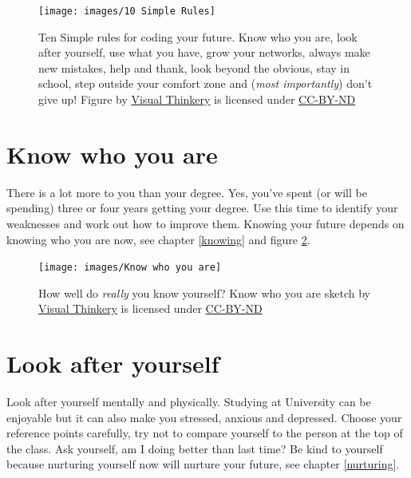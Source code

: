 \documentclass[
]{book}
\begin{document}
\begin{figure}

{\centering \texttt{[image: images/10 Simple Rules]} 

}

\caption{Ten Simple rules for coding your future. Know who you are, look after yourself, use what you have, grow your networks, always make new mistakes, help and thank, look beyond the obvious, stay in school, step outside your comfort zone and (\emph{most importantly}) don't give up! Figure by \href{https://visualthinkery.com/}{Visual Thinkery} is licensed under \href{https://creativecommons.org/licenses/by-nd/4.0/}{CC-BY-ND}}\label{fig:ten-simple-fig}
\end{figure}



\hypertarget{mybrand}{%
\section{Know who you are}\label{mybrand}}

There is a lot more to you than your degree. Yes, you've spent (or will be spending) three or four years getting your degree. Use this time to identify your weaknesses and work out how to improve them. Knowing your future depends on knowing who you are now, see chapter \ref{knowing} and figure \ref{fig:knowing-fig}.

\begin{figure}

{\centering \texttt{[image: images/Know who you are]} 

}

\caption{How well do \emph{really} you know yourself? Know who you are sketch by \href{https://visualthinkery.com}{Visual Thinkery} is licensed under \href{https://creativecommons.org/licenses/by-nd/4.0/}{CC-BY-ND}}\label{fig:knowing-fig}
\end{figure}



\hypertarget{onlyhuman}{%
\section{Look after yourself}\label{onlyhuman}}

Look after yourself mentally and physically. Studying at University can be enjoyable but it can also make you stressed, anxious and depressed. Choose your reference points carefully, try not to compare yourself to the person at the top of the class. Ask yourself, am I doing better than last time? Be kind to yourself because nurturing yourself now will nurture your future, see chapter \ref{nurturing}.
\end{document}

